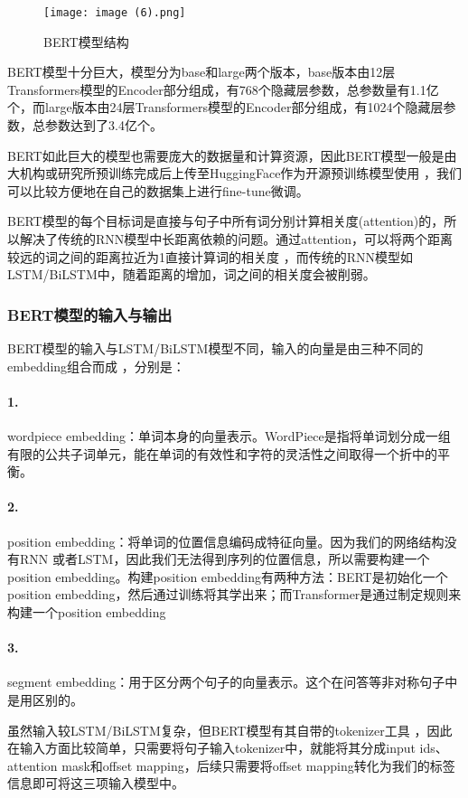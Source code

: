 \documentclass{article}
\begin{document}
\begin{figure}[H]
	\centering
    \texttt{[image: image (6).png]}
    \caption{BERT模型结构}
    \label{fig:BERT}
\end{figure}

BERT模型十分巨大，模型分为base和large两个版本，base版本由12层Transformers模型的Encoder部分组成，有768个隐藏层参数，总参数量有1.1亿个，而large版本由24层Transformers模型的Encoder部分组成，有1024个隐藏层参数，总参数达到了3.4亿个。

BERT如此巨大的模型也需要庞大的数据量和计算资源，因此BERT模型一般是由大机构或研究所预训练完成后上传至HuggingFace作为开源预训练模型使用\cite{wolf2019huggingface} ，我们可以比较方便地在自己的数据集上进行fine-tune微调。

BERT模型的每个目标词是直接与句子中所有词分别计算相关度(attention)的，所以解决了传统的RNN模型中长距离依赖的问题。通过attention，可以将两个距离较远的词之间的距离拉近为1直接计算词的相关度\cite{clark2019does} ，而传统的RNN模型如LSTM/BiLSTM中，随着距离的增加，词之间的相关度会被削弱。
\subsubsection{BERT模型的输入与输出}
BERT模型的输入与LSTM/BiLSTM模型不同，输入的向量是由三种不同的embedding组合而成\cite{devlin2018bert} ，分别是：
\paragraph{1.}  wordpiece embedding：单词本身的向量表示。WordPiece是指将单词划分成一组有限的公共子词单元，能在单词的有效性和字符的灵活性之间取得一个折中的平衡。
\paragraph{2.} position embedding：将单词的位置信息编码成特征向量。因为我们的网络结构没有RNN 或者LSTM，因此我们无法得到序列的位置信息，所以需要构建一个position embedding。构建position embedding有两种方法：BERT是初始化一个position embedding，然后通过训练将其学出来；而Transformer是通过制定规则来构建一个position embedding
\paragraph{3.} segment embedding：用于区分两个句子的向量表示。这个在问答等非对称句子中是用区别的。

虽然输入较LSTM/BiLSTM复杂，但BERT模型有其自带的tokenizer工具\cite{devlin2018bert} ，因此在输入方面比较简单，只需要将句子输入tokenizer中，就能将其分成input ids、attention mask和offset mapping，后续只需要将offset mapping转化为我们的标签信息即可将这三项输入模型中。
\end{document}
